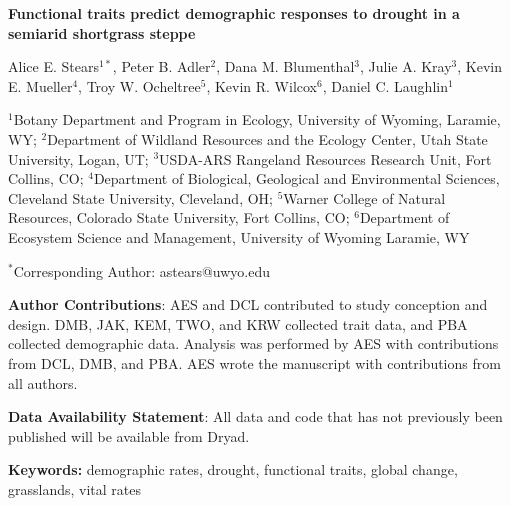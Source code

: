 \documentclass[12pt, letterpaper]{article}
\begin{document}
\begin{flushleft}
\Large{\textbf{Functional traits predict demographic responses to drought in a semiarid shortgrass steppe}} 

\normalsize{Alice E. Stears$^{1*}$, Peter B. Adler$^2$, Dana M. Blumenthal$^3$, Julie A. Kray$^3$, Kevin E. Mueller$^4$, Troy W. Ocheltree$^5$, Kevin R. Wilcox$^6$, Daniel C. Laughlin$^1$}

\small{$^1$Botany Department and Program in Ecology, University of Wyoming, Laramie, WY; \linebreak
$^2$Department of Wildland Resources and the Ecology Center, Utah State University, Logan, UT; \linebreak
$^3$USDA-ARS Rangeland Resources Research Unit, Fort Collins, CO; \linebreak
$^4$Department of Biological, Geological and Environmental Sciences, Cleveland State University, Cleveland, OH; \linebreak
$^5$Warner College of Natural Resources, Colorado State University, Fort Collins, CO; \linebreak
$^6$Department of Ecosystem Science and Management, University of Wyoming Laramie, WY}\linebreak

\small{$^*$Corresponding Author: astears@uwyo.edu}

\small{
\textbf{Author Contributions}: AES and DCL contributed to study conception and design. DMB, JAK, KEM, TWO, and KRW collected trait data, and PBA collected demographic data. Analysis was performed by AES with contributions from DCL, DMB, and PBA. AES wrote the manuscript with contributions from all authors. 
} 

\small{\textbf{Data Availability Statement}: All data and code that has not previously been published will be available from Dryad. }

\end{flushleft}
\textbf{Keywords:} demographic rates, drought, functional traits, global change, grasslands, vital rates
\end{document}
